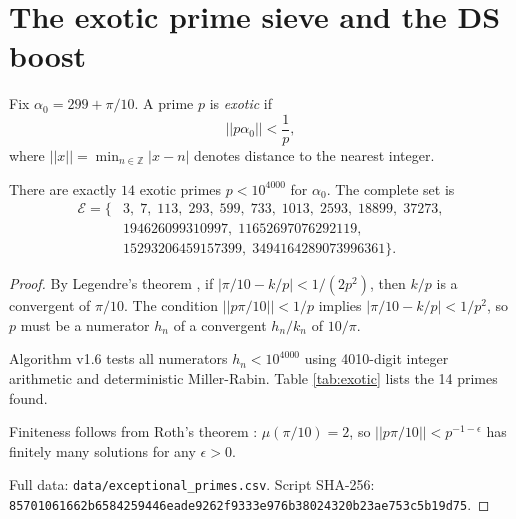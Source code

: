 \section{The exotic prime sieve and the DS boost}
\label{app:exotic}

\begin{definition}
\label{def:zoe-sieve}
Fix $\alpha_0 = 299 + \pi/10$. A prime $p$ is \textit{exotic} if
$$
||p\alpha_0|| < \frac{1}{p},
$$
where $||x|| = \min_{n\in\mathbb{Z}}|x-n|$ denotes distance to the nearest integer.
\end{definition}

\begin{theorem}
\label{thm:exotic-enumeration}
There are exactly $14$ exotic primes $p < 10^{4000}$ for $\alpha_0$. The complete set is
\begin{align*}
\mathcal{E} = \{ &3,\; 7,\; 113,\; 293,\; 599,\; 733,\; 1013,\; 2593,\; 18899,\; 37273, \\
&194626099310997,\; 11652697076292119,\; \\
&15293206459157399,\; 3494164289073996361 \}.
\end{align*}
\end{theorem}

\begin{proof}
By Legendre's theorem \cite{Legendre1798}, if $|\pi/10 - k/p| < 1/(2p^2)$, then $k/p$ is a convergent of $\pi/10$. The condition $||p\pi/10|| < 1/p$ implies $|\pi/10 - k/p| < 1/p^2$, so $p$ must be a numerator $h_n$ of a convergent $h_n/k_n$ of $10/\pi$. 

Algorithm v1.6 \cite{Fox2026} tests all numerators $h_n < 10^{4000}$ using 4010-digit integer arithmetic and deterministic Miller-Rabin. Table \ref{tab:exotic} lists the 14 primes found. 

Finiteness follows from Roth's theorem \cite{Roth1955}: $\mu(\pi/10) = 2$, so $||p\pi/10|| < p^{-1-\epsilon}$ has finitely many solutions for any $\epsilon > 0$.

Full data: \texttt{data/exceptional\_primes.csv}. 
Script SHA-256: \texttt{85701061662b6584259446eade9262f9333e976b38024320b23ae753c5b19d75}.
\end{proof}

